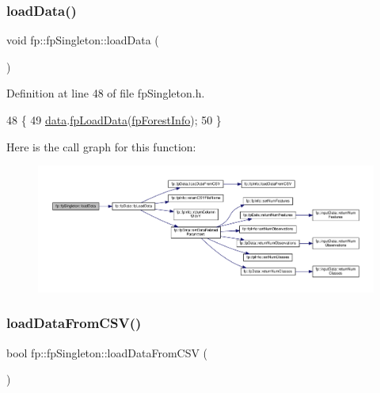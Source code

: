 \subsubsection{\texorpdfstring{load\+Data()}{loadData()}}
{\footnotesize\ttfamily void fp\+::fp\+Singleton\+::load\+Data (\begin{DoxyParamCaption}{ }\end{DoxyParamCaption})\hspace{0.3cm}{\ttfamily [inline]}}



Definition at line 48 of file fp\+Singleton.\+h.


\begin{DoxyCode}
48                                   \{
49                 \hyperlink{classfp_1_1fpSingleton_a2fa16ac6a0f66641749032eeee61b8e9}{data}.\hyperlink{classfp_1_1fpData_a91c727b1475eca340ca14c241b25c959}{fpLoadData}(\hyperlink{classfp_1_1fpSingleton_a85965009befa72a749ae498fa5b6ccfa}{fpForestInfo});
50             \}
\end{DoxyCode}
Here is the call graph for this function\+:
\nopagebreak
\begin{figure}[H]
\begin{center}
\leavevmode
\includegraphics[width=350pt]{classfp_1_1fpSingleton_a86042ae6be6f59dfb90232678350011a_cgraph}
\end{center}
\end{figure}
\mbox{\label{classfp_1_1fpSingleton_a12178de58f19494062efe5255d937171}} 
\subsubsection{\texorpdfstring{load\+Data\+From\+C\+S\+V()}{loadDataFromCSV()}}
{\footnotesize\ttfamily bool fp\+::fp\+Singleton\+::load\+Data\+From\+C\+SV (\begin{DoxyParamCaption}{ }\end{DoxyParamCaption})\hspace{0.3cm}{\ttfamily [inline]}}



